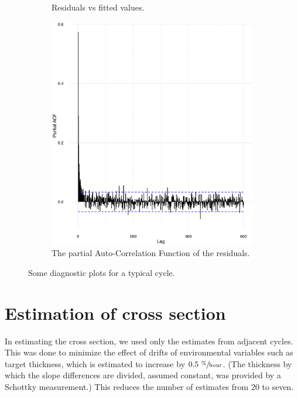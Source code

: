 \documentclass[reprint]{revtex4-1}
\newcommand{\scl}{.4}
\begin{document}
\begin{figure}
\begin{subfigure}{.5\textwidth}
\caption{Residuals vs fitted values.}
\end{subfigure}
\begin{subfigure}{.5\textwidth}
\includegraphics[scale=\scl]{img/Run969_residual_PACF.eps}
\caption{The partial Auto-Correlation Function of the residuals.}
\end{subfigure}
\caption{Some diagnostic plots for a typical cycle.\label{fig:Run969}}
\end{figure}

\section{Estimation of cross section}

In estimating the cross section, we used only the estimates from adjacent cycles. This was done to minimize the effect of drifts of environmental variables such as target thickness, which is estimated to increase by $0.5~ \sfrac{\%}{\mathrm{hour}}$. (The thickness by which the slope differences are divided, assumed constant, was provided by a Schottky measurement.) This reduces the number of estimates from 20 to seven. 
\end{document}
